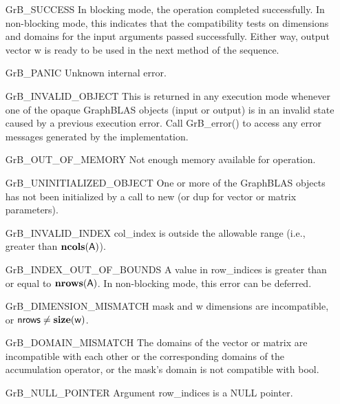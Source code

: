 \begin{itemize}[leftmargin=2.1in]
    \item[{\sf GrB\_SUCCESS}]         In blocking mode, the operation completed
    successfully. In non-blocking mode, this indicates that the compatibility 
    tests on dimensions and domains for the input arguments passed successfully. 
    Either way, output vector {\sf w} is ready to be used in the next method of 
    the sequence.

    \item[{\sf GrB\_PANIC}]           Unknown internal error.

    \item[{\sf GrB\_INVALID\_OBJECT}] This is returned in any execution mode 
    whenever one of the opaque GraphBLAS objects (input or output) is in an invalid 
    state caused by a previous execution error.  Call {\sf GrB\_error()} to access 
    any error messages generated by the implementation.

    \item[{\sf GrB\_OUT\_OF\_MEMORY}] Not enough memory available for operation.

    \item[{\sf GrB\_UNINITIALIZED\_OBJECT}] One or more of the GraphBLAS objects
    has not been initialized by a call to {\sf new} (or {\sf dup} for vector
    or matrix parameters).

    \item[{\sf GrB\_INVALID\_INDEX}]    {\sf col\_index} is outside the allowable 
    range (i.e., greater than $\bold{ncols}({\sf A})$).

    \item[{\sf GrB\_INDEX\_OUT\_OF\_BOUNDS}]  A value in {\sf row\_indices} 
    is greater than or equal to $\bold{nrows}({\sf A})$.  In 
    non-blocking mode, this error can be deferred.

    \item[{\sf GrB\_DIMENSION\_MISMATCH}] {\sf mask} and {\sf w} dimensions are
    incompatible, or ${\sf nrows} \neq \bold{size}({\sf w})$.

    \item[{\sf GrB\_DOMAIN\_MISMATCH}]     The domains of the vector or matrix
    are incompatible with each other or the corresponding domains of the 
    accumulation operator, or the mask's domain is not compatible with {\sf bool}.

    \item[{\sf GrB\_NULL\_POINTER}] Argument {\sf row\_indices} is a {\sf NULL} pointer.
\end{itemize}

